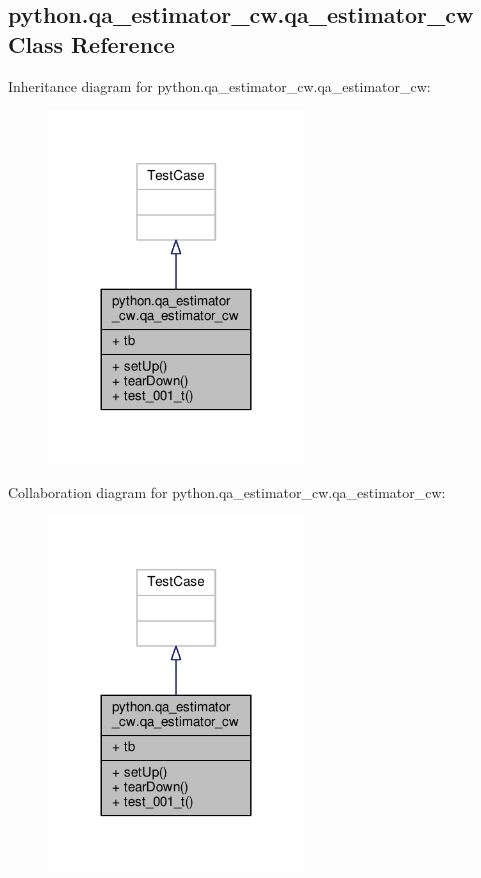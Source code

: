 \subsection{python.\+qa\+\_\+estimator\+\_\+cw.\+qa\+\_\+estimator\+\_\+cw Class Reference}
\label{classpython_1_1qa__estimator__cw_1_1qa__estimator__cw}


Inheritance diagram for python.\+qa\+\_\+estimator\+\_\+cw.\+qa\+\_\+estimator\+\_\+cw\+:
\nopagebreak
\begin{figure}[H]
\begin{center}
\leavevmode
\includegraphics[width=192pt]{d0/db7/classpython_1_1qa__estimator__cw_1_1qa__estimator__cw__inherit__graph}
\end{center}
\end{figure}


Collaboration diagram for python.\+qa\+\_\+estimator\+\_\+cw.\+qa\+\_\+estimator\+\_\+cw\+:
\nopagebreak
\begin{figure}[H]
\begin{center}
\leavevmode
\includegraphics[width=192pt]{d9/df0/classpython_1_1qa__estimator__cw_1_1qa__estimator__cw__coll__graph}
\end{center}
\end{figure}
